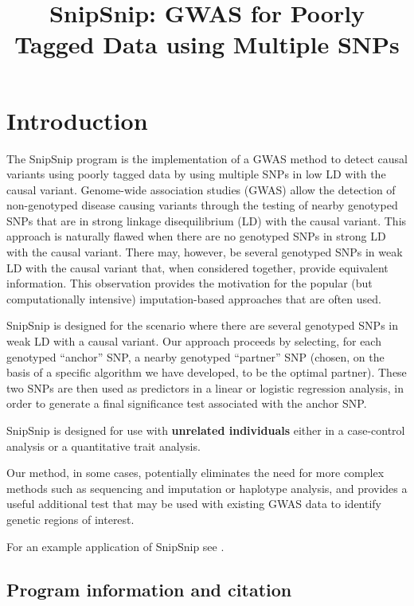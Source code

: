 \documentclass[a4paper,12pt]{article}
\begin{document}
\title{SnipSnip: GWAS for Poorly Tagged Data using Multiple SNPs}
\date{}
\author{}
\maketitle
\newpage
\tableofcontents
\newpage
\section{Introduction}
\label{introduction}

The SnipSnip program is the implementation of a GWAS method to detect causal variants using poorly tagged data by using multiple SNPs in low LD with the causal variant. Genome-wide association studies (GWAS) allow the detection of non-genotyped disease causing variants through the testing of nearby genotyped SNPs that are in strong linkage disequilibrium (LD) with the causal variant. This approach is naturally flawed when there are no genotyped SNPs in strong LD with the causal variant. There may, however, be several genotyped SNPs in weak LD with the causal variant that, when considered together, provide equivalent information. This observation provides the motivation for the popular (but computationally intensive) imputation-based approaches that are often used. 

SnipSnip is designed for the scenario where there are several genotyped SNPs in weak LD with a causal variant. Our approach proceeds by selecting, for each genotyped ``anchor'' SNP, a nearby genotyped ``partner'' SNP (chosen, on the basis of a specific algorithm we have developed, to be the optimal partner). These two SNPs are then used as predictors in a linear or logistic regression analysis, in order to generate a final significance test associated with the anchor SNP. 

SnipSnip is designed for use with {\bf unrelated individuals} either in a case-control analysis or a quantitative trait analysis. 

Our method, in some cases, potentially eliminates the need for more complex methods such as sequencing and imputation or haplotype analysis, and provides a useful additional test that may be used with existing GWAS data to identify genetic regions of interest. 

For an example application of SnipSnip see \citet{chen:etal:15}. 
\subsection{Program information and citation}
\label{information}
\end{document}
